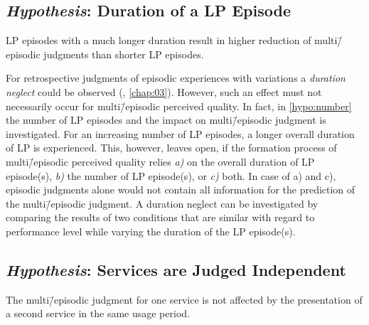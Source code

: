 \subsection[H6: Duration of a \acs{LP} Episode]{\emph{Hypothesis}: Duration of a \acs{LP} Episode}
\begin{hypothesis}\label{hypo:duration}
\ac{LP} episodes with a much longer duration result in higher reduction of multi\=/episodic judgments than shorter \ac{LP} episodes.
\end{hypothesis}

For retrospective judgments of episodic experiences with variations a \emph{duration neglect} could be observed (\cf, \autoref{chap:03}).
However, such an effect must not necessarily occur for multi\=/episodic perceived quality.
In fact, in \autoref{hypo:number} the number of \ac{LP} episodes and the impact on multi\=/episodic judgment is investigated.
For an increasing number of \ac{LP} episodes, a longer overall duration of \ac{LP} is experienced.
This, however, leaves open, if the formation process of multi\=/episodic perceived quality relies \emph{a)} on the overall duration of \ac{LP} episode(s), \emph{b)} the number of \ac{LP} episode(s), or \emph{c)} both.
In case of a) and c), episodic judgments alone would not contain all information for the prediction of the multi\=/episodic judgment.
A duration neglect can be investigated by comparing the results of two conditions that are similar with regard to performance level while varying the duration of the \ac{LP} episode(s).

\subsection[H7: Services are Judged Independent]{\emph{Hypothesis}: Services are Judged Independent}
\begin{hypothesis}\label{hypo:independent}
The multi\=/episodic judgment for one service is not affected by the presentation of a second service in the same usage period.
\end{hypothesis}

